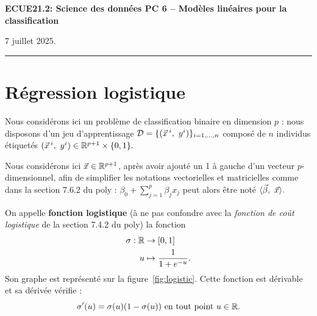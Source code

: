 \documentclass[french,11pt]{article}
\begin{document}
\begin{center}
\bf\large ECUE21.2: Science des données \hfill
PC 6 -- Modèles linéaires pour la classification
\end{center}

\noindent
\hfill 7 juillet 2025.

\noindent
\rule{\textwidth}{.4pt}



\section{Régression logistique}
Nous considérons ici un problème de classification binaire en
dimension $p$ : nous disposons d'un jeu d'apprentissage
$\DD = \{(\xx^i,~y^i)\}_{i=1, \dots, n}$ composé de $n$ individus étiquetés
$(\xx^i,~y^i) \in \RR^{p+1} \times \{0, 1\}.$

Nous considérons ici $\xx \in \RR^{p+1}$, après avoir ajouté un 1 à gauche d'un
vecteur $p$-dimensionnel, afin de simplifier les notations vectorielles et
matricielles comme dans la section 7.6.2 du poly :
$\beta_0 + \sum_{j=1}^p \beta_j x_j$ peut alors être noté
$\innerproduct{\bbeta,~\xx}.$ 

On appelle \textbf{fonction logistique} (à ne pas confondre avec la
\textit{fonction de coût logistique} de la section 7.4.2 du poly) la fonction
\begin{equation*}
\begin{split}
  \sigma: \mathbb{R} & \rightarrow [0, 1]\\
  u & \mapsto \frac{1}{1+e^{-u}}. 
\end{split}
\end{equation*}
Son graphe est représenté sur la figure~\ref{fig:logistic}. Cette fonction est
dérivable et sa dérivée vérifie :
\begin{equation}
  \sigma^\prime(u) = \sigma(u) (1-\sigma(u)) \text{ en tout point } u \in \mathbb{R}.
  \label{eq:sigma_prime}
\end{equation}
\end{document}
